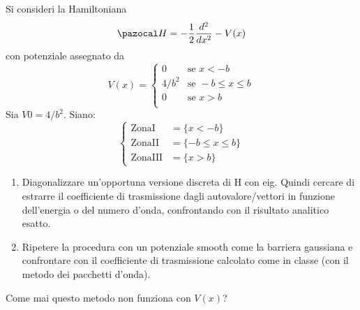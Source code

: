 Si consideri la Hamiltoniana
$$ \Hh = -\frac{1}{2} \frac{ d^2}{dx^2} - V(x) $$
con potenziale assegnato da
$$
V(x)  = \begin{cases}
        0       & \mbox{se } x<-b \\
        4/b^2   & \mbox{se } -b \leq x \leq b \\
        0       & \mbox{se } x>b \\
         \end{cases}
$$
Sia $V0 = 4/b^2$. Siano:
$$
\begin{cases}
    \mbox{ZonaI} & = \{x<-b \} \\
    \mbox{ZonaII} & = \{-b \leq x \leq b\} \\
    \mbox{ZonaIII} & = \{x>b\}
\end{cases} $$
%
\begin{enumerate}
  \item Diagonalizzare un'opportuna versione discreta di H con eig. Quindi cercare di
  estrarre il coefficiente di trasmissione dagli autovalore/vettori in funzione dell'energia
  o del numero d'onda, confrontando con il risultato analitico esatto.

  \item Ripetere la procedura con un potenziale smooth come la barriera gaussiana e confrontare
  con il coefficiente di trasmissione calcolato come in classe (con il metodo
  dei pacchetti d'onda).
\end{enumerate}

Come mai questo metodo non funziona con $V(x)$?
